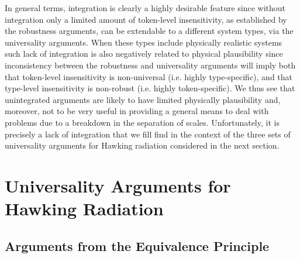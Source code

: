 \documentclass[12pt,english]{article}
\numberwithin{equation}{section}
\begin{document}
In general terms, integration is clearly a highly desirable feature since without integration only a limited amount of token-level insensitivity, as established by the robustness arguments, can be extendable to a different system types, via the universality arguments. When these types include physically realistic systems such lack of integration is also negatively related to physical plausibility since inconsistency between the robustness and universality arguments will imply both that token-level insensitivity is non-universal (i.e. highly type-specific), and that type-level insensitivity is non-robust (i.e. highly token-specific). We thus see that unintegrated arguments are likely to have limited physically plausibility and, moreover, not to be very useful in providing a general means to deal with problems due to a breakdown in the separation of scales. Unfortunately, it is precisely a lack of integration that we fill find in the context of the three sets of universality arguments for Hawking radiation considered in the next section.

\section{Universality Arguments for Hawking Radiation} 

\label{sec:universality_arguments_for_hawking_radiation}

\subsection{Arguments from the Equivalence Principle} %
\label{sec:unruh_universality_and_the_equivalence_principle}
\end{document}
